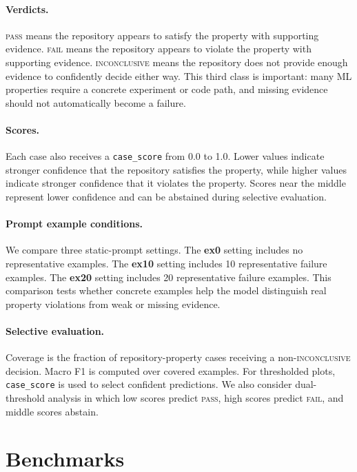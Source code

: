 \documentclass[11pt]{article}
\newcommand{\pass}{\textsc{pass}}
\newcommand{\fail}{\textsc{fail}}
\newcommand{\inconclusive}{\textsc{inconclusive}}
\begin{document}
\paragraph{Verdicts.}
\pass{} means the repository appears to satisfy the property with supporting evidence.
\fail{} means the repository appears to violate the property with supporting evidence.
\inconclusive{} means the repository does not provide enough evidence to confidently decide either way.
This third class is important: many ML properties require a concrete experiment or code path, and missing evidence should not automatically become a failure.

\paragraph{Scores.}
Each case also receives a \texttt{case\_score} from 0.0 to 1.0.
Lower values indicate stronger confidence that the repository satisfies the property, while higher values indicate stronger confidence that it violates the property.
Scores near the middle represent lower confidence and can be abstained during selective evaluation.

\paragraph{Prompt example conditions.}
We compare three static-prompt settings.
The \textbf{ex0} setting includes no representative examples.
The \textbf{ex10} setting includes 10 representative failure examples.
The \textbf{ex20} setting includes 20 representative failure examples.
This comparison tests whether concrete examples help the model distinguish real property violations from weak or missing evidence.

\paragraph{Selective evaluation.}
Coverage is the fraction of repository-property cases receiving a non-\inconclusive{} decision.
Macro F1 is computed over covered examples.
For thresholded plots, \texttt{case\_score} is used to select confident predictions.
We also consider dual-threshold analysis in which low scores predict \pass, high scores predict \fail, and middle scores abstain.

\section{Benchmarks}
\label{sec:benchmarks}
\end{document}
